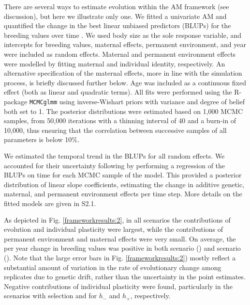 There are several ways to estimate evolution within the AM framework (see discussion), but here we illustrate only one. We fitted a univariate AM and quantified the change in the best linear unbiased predictors (BLUPs) for the breeding values over time \parencite[][]{Postma2006,Hadfield2010b}. We used body size as the sole response variable, and intercepts for breeding values, maternal effects, permanent environment, and year were included as random effects. Maternal and permanent environment effects were modelled by fitting maternal and individual identity, respectively. An alternative specification of the maternal effects, more in line with the simulation process, is briefly discussed further below. Age was included as a continuous fixed effect (both as linear and quadratic terms). All fits were performed using the R-package \texttt{MCMCglmm} \parencite{Hadfield2010a} using inverse-Wishart priors with variance and degree of belief both set to 1. The posterior distributions were estimated based on 1,000 MCMC samples, from 50,000 iterations with a thinning interval of 40 and a burn-in of 10,000, thus ensuring that the correlation between successive samples of all parameters is below 10\%. 

We estimated the temporal trend in the BLUPs for all random effects. We accounted for their uncertainty following \cite{Hadfield2010b} by performing a regression of the BLUPs on time for each MCMC sample of the model. This provided a posterior distribution of linear slope coefficients, estimating the change in additive genetic, maternal, and permanent environment effects per time step. More details on the fitted models are given in S2.1.

As depicted in Fig. \ref{frameworkresults:2}, in all scenarios the contributions of evolution and individual plasticity were largest, while the contributions of permanent environment and maternal effects were very small. On average, the per year change in breeding values was positive in both scenario \Sh () and scenario \SH (). Note that the large error bars in Fig. \ref{frameworkresults:2}) mostly reflect a substantial amount of variation in the rate of evolutionary change among replicates due to genetic drift, rather than the uncertainty in the point estimates. Negative contributions of individual plasticity were found, particularly in the scenarios with selection  and  for $h_{-}$ and $h_+$, respectively.

